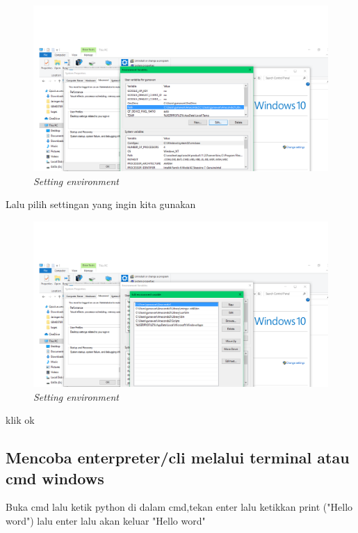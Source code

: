 \begin{figure}[!htbp]
    \centering
    \includegraphics[scale=0.3]{gambar/cek ev3.png}
    \caption{\textit{Setting environment}}
    \label{Figure23512}
\end{figure}

\par Lalu pilih settingan yang ingin kita gunakan

\begin{figure}[!htbp]
    \centering
    \includegraphics[scale=0.3]{gambar/cek ev4.png}
    \caption{\textit{Setting environment}}
    \label{Figure12}
\end{figure}

\par klik ok 

\subsection{Mencoba enterpreter/cli melalui terminal atau cmd windows}

\par Buka cmd lalu ketik python di dalam cmd,tekan enter lalu ketikkan print ("Hello word") lalu enter lalu akan keluar "Hello word"

